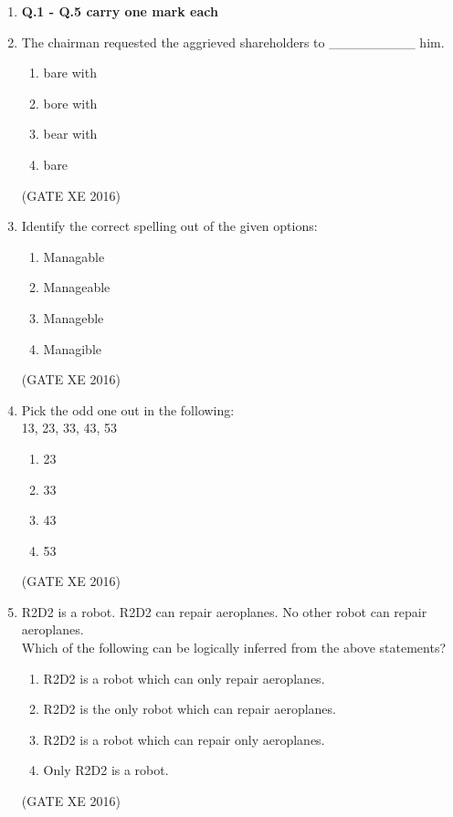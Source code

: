 \documentclass[12pt]{article}
\begin{document}
\begin{enumerate}

\item[] \textbf{Q.1 - Q.5 carry one mark each}

  \item The chairman requested the aggrieved shareholders to \_\_\_\_\_\_\_\_\_ him.
  \begin{multicols}{4}
  \begin{enumerate}
    \item bare with
    \item bore with
    \item bear with
    \item bare
  \end{enumerate}
  \end{multicols}
  (GATE XE 2016)

  \item Identify the correct spelling out of the given options:
  \begin{multicols}{4}
  \begin{enumerate}
    \item Managable
    \item Manageable
    \item Manageble
    \item Managible
  \end{enumerate}
  \end{multicols}
  (GATE XE 2016)

  \item Pick the odd one out in the following: \\
  13, 23, 33, 43, 53
  \begin{multicols}{4}
  \begin{enumerate}
    \item 23
    \item 33
    \item 43
    \item 53
  \end{enumerate}
  \end{multicols}
  (GATE XE 2016)

  \item R2D2 is a robot. R2D2 can repair aeroplanes. No other robot can repair aeroplanes. \\
  Which of the following can be logically inferred from the above statements?
  \begin{enumerate}
    \item R2D2 is a robot which can only repair aeroplanes.
    \item R2D2 is the only robot which can repair aeroplanes.
    \item R2D2 is a robot which can repair only aeroplanes.
    \item Only R2D2 is a robot.
  \end{enumerate}
  (GATE XE 2016)


\end{enumerate}
\end{document}
